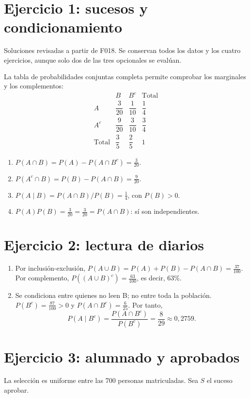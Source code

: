 \documentclass[11pt]{article}
\begin{document}
\renewcommand{\arraystretch}{2.2}
\section*{Ejercicio 1: sucesos y condicionamiento}
Soluciones revisadas a partir de F018. Se conservan todos los datos y los cuatro ejercicios, aunque solo dos de las tres opcionales se evalúan.

La tabla de probabilidades conjuntas completa permite comprobar los marginales y los complementos:
\[
\begin{array}{c|cc|c}
 & B & B^c & \text{Total}\\\hline
 A & \dfrac{3}{20} & \dfrac{1}{10} & \dfrac{1}{4}\\
 A^c & \dfrac{9}{20} & \dfrac{3}{10} & \dfrac{3}{4}\\\hline
 \text{Total} & \dfrac{3}{5} & \dfrac{2}{5} & 1
\end{array}
\]
\begin{enumerate}[label=(\alph*)]
\item $P(A\cap B)=P(A)-P(A\cap B^c)=\boxed{\frac{3}{20}}$.
\item $P(A^c\cap B)=P(B)-P(A\cap B)=\boxed{\frac{9}{20}}$.
\item $P(A\mid B)=P(A\cap B)/P(B)=\boxed{\frac{1}{4}}$, con $P(B)>0$.
\item $P(A)P(B)=\frac{3}{20}=\frac{3}{20}=P(A\cap B)$: sí son independientes.
\end{enumerate}
\clearpage\section*{Ejercicio 2: lectura de diarios}
\begin{enumerate}[label=(\alph*)]
\item Por inclusión-exclusión, $P(A\cup B)=P(A)+P(B)-P(A\cap B)=\frac{37}{100}$. Por complemento, $P((A\cup B)^c)=\boxed{\frac{63}{100}}$, es decir, 63\%.
\item Se condiciona entre quienes no leen B; no entre toda la población. $P(B^c)=\frac{87}{100}>0$ y $P(A\cap B^c)=\frac{6}{25}$. Por tanto,\[P(A\mid B^c)=\frac{P(A\cap B^c)}{P(B^c)}=\boxed{\frac{8}{29}}\approx 0,2759.\]
\end{enumerate}\clearpage\section*{Ejercicio 3: alumnado y aprobados}
La selección es uniforme entre las 700 personas matriculadas. Sea $S$ el suceso aprobar.
\end{document}

